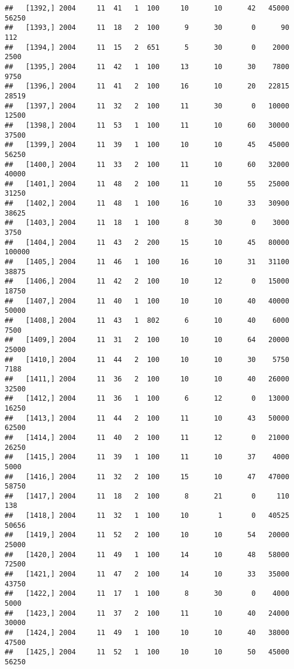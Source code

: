 \documentclass{article}\usepackage[]{graphicx}\usepackage[]{color}
\makeatletter
\newenvironment{kframe}{%
 \def\at@end@of@kframe{}%
 \ifinner\ifhmode%
  \def\at@end@of@kframe{\end{minipage}}%
  \begin{minipage}{\columnwidth}%
 \fi\fi%
 \def\FrameCommand##1{\hskip\@totalleftmargin \hskip-\fboxsep
 \colorbox{shadecolor}{##1}\hskip-\fboxsep
     \hskip-\linewidth \hskip-\@totalleftmargin \hskip\columnwidth}%
 \MakeFramed {\advance\hsize-\width
   \@totalleftmargin\z@ \linewidth\hsize
   \@setminipage}}%
 {\par\unskip\endMakeFramed%
 \at@end@of@kframe}
\newenvironment{knitrout}{}{} %
\makeatother
\begin{document}
\begin{knitrout}
\begin{kframe}
\begin{verbatim}
##   [1392,] 2004     11  41   1  100     10      10      42   45000   56250
##   [1393,] 2004     11  18   2  100      9      30       0      90     112
##   [1394,] 2004     11  15   2  651      5      30       0    2000    2500
##   [1395,] 2004     11  42   1  100     13      10      30    7800    9750
##   [1396,] 2004     11  41   2  100     16      10      20   22815   28519
##   [1397,] 2004     11  32   2  100     11      30       0   10000   12500
##   [1398,] 2004     11  53   1  100     11      10      60   30000   37500
##   [1399,] 2004     11  39   1  100     10      10      45   45000   56250
##   [1400,] 2004     11  33   2  100     11      10      60   32000   40000
##   [1401,] 2004     11  48   2  100     11      10      55   25000   31250
##   [1402,] 2004     11  48   1  100     16      10      33   30900   38625
##   [1403,] 2004     11  18   1  100      8      30       0    3000    3750
##   [1404,] 2004     11  43   2  200     15      10      45   80000  100000
##   [1405,] 2004     11  46   1  100     16      10      31   31100   38875
##   [1406,] 2004     11  42   2  100     10      12       0   15000   18750
##   [1407,] 2004     11  40   1  100     10      10      40   40000   50000
##   [1408,] 2004     11  43   1  802      6      10      40    6000    7500
##   [1409,] 2004     11  31   2  100     10      10      64   20000   25000
##   [1410,] 2004     11  44   2  100     10      10      30    5750    7188
##   [1411,] 2004     11  36   2  100     10      10      40   26000   32500
##   [1412,] 2004     11  36   1  100      6      12       0   13000   16250
##   [1413,] 2004     11  44   2  100     11      10      43   50000   62500
##   [1414,] 2004     11  40   2  100     11      12       0   21000   26250
##   [1415,] 2004     11  39   1  100     11      10      37    4000    5000
##   [1416,] 2004     11  32   2  100     15      10      47   47000   58750
##   [1417,] 2004     11  18   2  100      8      21       0     110     138
##   [1418,] 2004     11  32   1  100     10       1       0   40525   50656
##   [1419,] 2004     11  52   2  100     10      10      54   20000   25000
##   [1420,] 2004     11  49   1  100     14      10      48   58000   72500
##   [1421,] 2004     11  47   2  100     14      10      33   35000   43750
##   [1422,] 2004     11  17   1  100      8      30       0    4000    5000
##   [1423,] 2004     11  37   2  100     11      10      40   24000   30000
##   [1424,] 2004     11  49   1  100     10      10      40   38000   47500
##   [1425,] 2004     11  52   1  100     10      10      50   45000   56250

\end{verbatim}
\end{kframe}
\end{knitrout}
\end{document}

